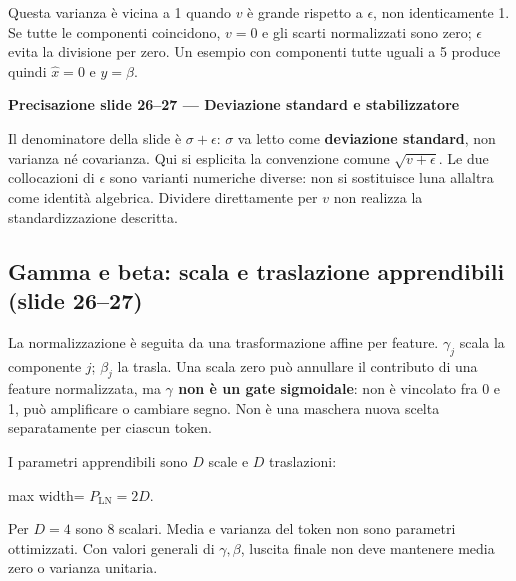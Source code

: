 \documentclass[11pt,a4paper,oneside,openany]{book}
\renewenvironment{quote}{\list{}{\leftmargin=1em\rightmargin=0pt}\item\relax}{\endlist}
\begin{document}
Questa varianza è vicina a 1 quando \(v\) è grande rispetto a \(\epsilon\), non identicamente 1. Se tutte le componenti coincidono, \(v=0\) e gli scarti normalizzati sono zero; \(\epsilon\) evita la divisione per zero. Un esempio con componenti tutte uguali a 5 produce quindi \(\widehat x=0\) e \(y=\beta\).

\begin{quote}
\textbf{Precisazione slide 26--27 --- Deviazione standard e stabilizzatore}
\end{quote}

\begin{quote}
Il denominatore della slide è \(\sigma+\epsilon\): \(\sigma\) va letto come \textbf{deviazione standard}, non varianza né covarianza. Qui si esplicita la convenzione comune \(\sqrt{v+\epsilon}\). Le due collocazioni di \(\epsilon\) sono varianti numeriche diverse: non si sostituisce l\textquotesingle una all\textquotesingle altra come identità algebrica. Dividere direttamente per \(v\) non realizza la standardizzazione descritta.
\end{quote}

\subsection{Gamma e beta: scala e traslazione apprendibili (slide 26--27)}\label{f04-r438}

La normalizzazione è seguita da una trasformazione affine per feature. \(\gamma_j\) scala la componente \(j\); \(\beta_j\) la trasla. Una scala zero può annullare il contributo di una feature normalizzata, ma \textbf{\(\gamma\) non è un gate sigmoidale}: non è vincolato fra 0 e 1, può amplificare o cambiare segno. Non è una maschera nuova scelta separatamente per ciascun token.

I parametri apprendibili sono \(D\) scale e \(D\) traslazioni:

\begin{center}
\begin{adjustbox}{max width=\linewidth}
$\displaystyle \boxed{P_{\mathrm{LN}}=2D.}$
\end{adjustbox}
\end{center}

Per \(D=4\) sono 8 scalari. Media e varianza del token non sono parametri ottimizzati. Con valori generali di \(\gamma,\beta\), l\textquotesingle uscita finale non deve mantenere media zero o varianza unitaria.
\end{document}
